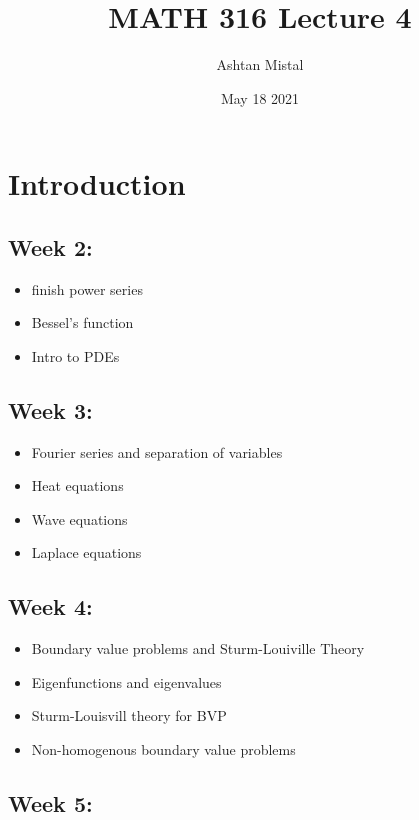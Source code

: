 \documentclass{article}
\title{MATH 316 Lecture 4}
\author{Ashtan Mistal}
\date{May 18 2021}
\begin{document}
\ifstandalone
\maketitle
\fi

\graphicspath{{./Lecture04/}}

\section{Introduction}

\subsection*{Week 2:}

\begin{itemize}
    \item finish power series
    \item Bessel's function
    \item Intro to PDEs
\end{itemize}

\subsection*{Week 3:}

\begin{itemize}
    \item Fourier series and separation of variables
    \item Heat equations
    \item Wave equations
    \item Laplace equations
\end{itemize}

\subsection*{Week 4:}

\begin{itemize}
    \item Boundary value problems and Sturm-Louiville Theory
    \item Eigenfunctions and eigenvalues
    \item Sturm-Louisvill theory for BVP
    \item Non-homogenous boundary value problems
\end{itemize}

\subsection*{Week 5:}
\end{document}
